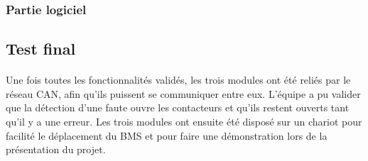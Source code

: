 		\subsubsection{Partie logiciel}	
		
			\paragraph{}		
			
	
	
			
	\subsection{Test final}
	
		\paragraph{}
		Une fois toutes les fonctionnalités validés, les trois modules ont été reliés par le réseau CAN, afin qu’ils puissent se communiquer entre eux. L’équipe a pu valider que la détection d’une faute ouvre les contacteurs et qu’ils restent ouverts tant qu’il y a une erreur. Les trois modules ont ensuite été disposé sur un chariot pour facilité le déplacement du BMS et pour faire une démonstration lors de la présentation du projet.
		
		